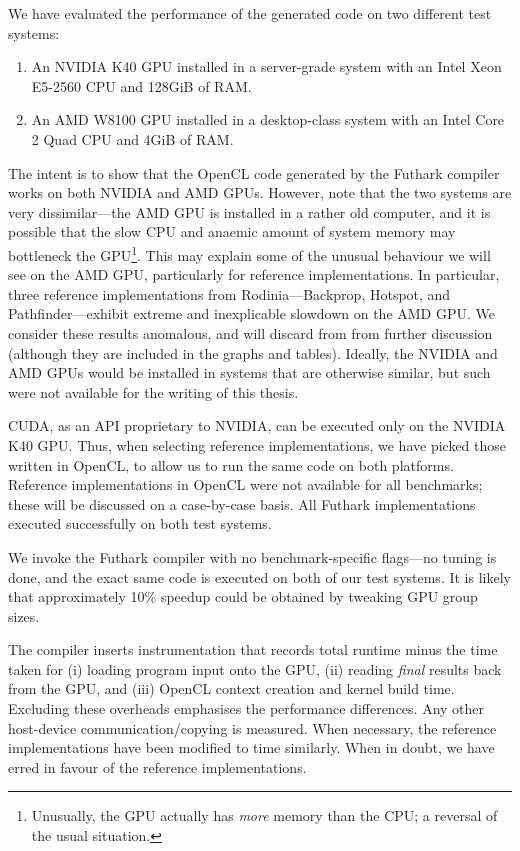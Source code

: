 We have evaluated the performance of the generated code on two
different test systems:

\begin{enumerate}
\item An NVIDIA K40 GPU installed in a server-grade system with an
  Intel Xeon E5-2560 CPU and 128GiB of RAM.
\item An AMD W8100 GPU installed in a desktop-class system with an
  Intel Core 2 Quad CPU and 4GiB of RAM.
\end{enumerate}

The intent is to show that the OpenCL code generated by the Futhark
compiler works on both NVIDIA and AMD GPUs.  However, note that the
two systems are very dissimilar---the AMD GPU is installed in a rather
old computer, and it is possible that the slow CPU and anaemic amount
of system memory may bottleneck the GPU\footnote{Unusually, the GPU
  actually has \textit{more} memory than the CPU; a reversal of the
  usual situation.}.  This may explain some of the unusual behaviour
we will see on the AMD GPU, particularly for reference
implementations.  In particular, three reference implementations from
Rodinia---Backprop, Hotspot, and Pathfinder---exhibit extreme and
inexplicable slowdown on the AMD GPU.  We consider these results
anomalous, and will discard from from further discussion (although
they are included in the graphs and tables).  Ideally, the NVIDIA and
AMD GPUs would be installed in systems that are otherwise similar, but
such were not available for the writing of this thesis.

CUDA, as an API proprietary to NVIDIA, can be executed only on the
NVIDIA K40 GPU.  Thus, when selecting reference implementations, we
have picked those written in OpenCL, to allow us to run the same code
on both platforms.  Reference implementations in OpenCL were not
available for all benchmarks; these will be discussed on a
case-by-case basis.  All Futhark implementations executed successfully
on both test systems.

We invoke the Futhark compiler with no benchmark-specific flags---no
tuning is done, and the exact same code is executed on both of our
test systems.  It is likely that approximately 10\% speedup could be
obtained by tweaking GPU group sizes.

The compiler inserts instrumentation that records total runtime minus
the time taken for (i) loading program input onto the GPU, (ii)
reading \textit{final} results back from the GPU, and (iii) OpenCL
context creation and kernel build time.  Excluding these overheads
emphasises the performance differences.  Any other host-device
communication/copying is measured.  When necessary, the reference
implementations have been modified to time similarly.  When in doubt,
we have erred in favour of the reference implementations.

